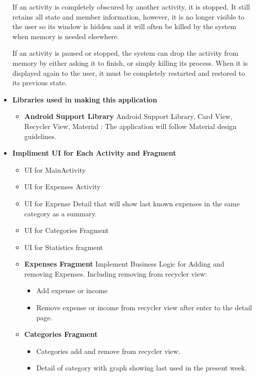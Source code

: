 \begin{itemize}
If an activity is completely obscured by another activity, it is stopped. It still
retains all state and member information, however, it is no longer visible to
the user so its window is hidden and it will often be killed by the system when
memory is needed elsewhere.

If an activity is paused or stopped, the system can drop the activity from memory by either asking it to finish, or simply killing its process. When it is displayed again to the user, it must be completely restarted and restored to its previous state.


\item \textbf{Libraries used in making this application}

\begin{itemize}
	\item \textbf{Android Support Library}
Android Support Library, Card View, Recycler View, Material : The application will
follow Material design guidelines.

\end{itemize}

\item \textbf{Impliment UI for Each Activity and Fragment}

\begin{itemize}
	\item UI for MainActivity
\item UI for Expenses Activity
 \item UI for Expense Detail that will show last known expenses in the same category as a summary.
\item UI for Categories Fragment
\item UI for Statistics fragment
\end{itemize}

\begin{itemize}
	\item \textbf{Expenses Fragment}
Implement Business Logic for Adding and removing Expenses. Including removing from
recycler view:
\begin{itemize}
	\item Add expense or income
\item Remove expense or income from recycler view after enter to the detail page.
\end{itemize}

\item \textbf{Categories Fragment}
\begin{itemize}
	\item Categories add and remove from recycler view.
\item Detail of category with graph showing last used in the present week.
\end{itemize}




\end{itemize}
\end{itemize}
